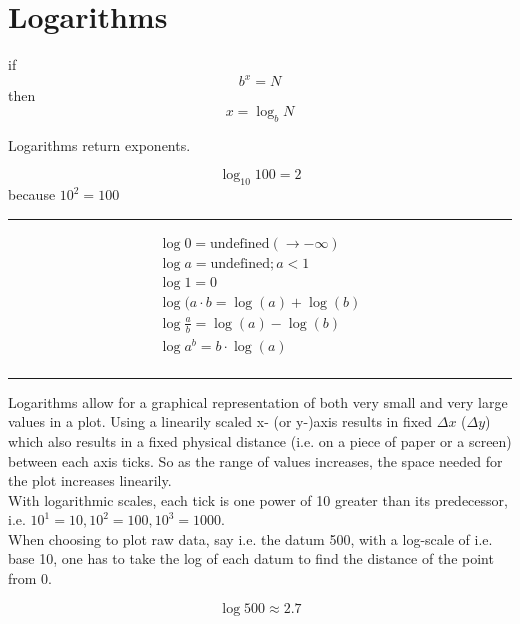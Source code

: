 \documentclass[a4paper, 12pt]{article}
\newcommand{\holine}{
  \noindent\rule{\textwidth}{0.618pt}
}
\begin{document}
\section*{Logarithms}

if
$$ b^x = N $$
then
$$ x = \log_b{N} $$

\begin{center}
Logarithms return exponents.
\end{center}

$$ \log_{10}{100} = 2 $$
because $10^2 = 100$

\holine

\begin{align*}
  \log{0} = \textrm{undefined} (\rightarrow -\infty)\\
  \log{a} = \textrm{undefined} ; a<1\\
  \log{1} = 0 \\
  \log{(a \cdot b} = \log(a) + \log(b)\\
  \log{\frac{a}{b}} = \log(a) - \log(b)\\
  \log{a^b} = b\cdot\log(a)\\
\end{align*}

\holine

\begin{center}
\end{center}

Logarithms allow for a graphical representation of both very small and very
large values in a plot. Using a linearily scaled x- (or y-)axis results in fixed
$\Delta x$ ($\Delta y$) which also results in a fixed physical distance (i.e. on
a piece of paper or a screen) between each axis ticks. So as the range of values
increases, the space needed for the plot increases linearily.\\

With logarithmic scales, each tick is one power of 10 greater than its
predecessor, i.e. $10^1 = 10, 10^2 = 100, 10^3 = 1000$.\\

When choosing to plot raw data, say i.e. the datum 500, with a log-scale of i.e. base 10,
one has to take the log of each datum to find the distance of the point from 0.

\[ \log{500} \approx 2.7 \]
\end{document}
